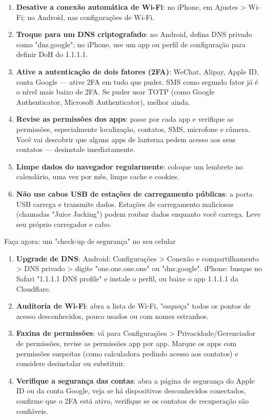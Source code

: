 \begin{enumerate}
  \item \textbf{Desative a conexão automática de Wi-Fi}: no iPhone, em Ajustes > Wi-Fi; no Android, nas configurações de Wi-Fi.
  \item \textbf{Troque para um DNS criptografado}: no Android, defina DNS privado como "dns.google"; no iPhone, use um app ou perfil de configuração para definir DoH do 1.1.1.1.
  \item \textbf{Ative a autenticação de dois fatores (2FA)}: WeChat, Alipay, Apple ID, conta Google — ative 2FA em tudo que puder. SMS como segundo fator já é o nível mais baixo de 2FA. Se puder usar TOTP (como Google Authenticator, Microsoft Authenticator), melhor ainda.
  \item \textbf{Revise as permissões dos apps}: passe por cada app e verifique as permissões, especialmente localização, contatos, SMS, microfone e câmera. Você vai descobrir que alguns apps de lanterna pedem acesso aos seus contatos — desinstale imediatamente.
  \item \textbf{Limpe dados do navegador regularmente}: coloque um lembrete no calendário, uma vez por mês, limpe cache e cookies.
  \item \textbf{Não use cabos USB de estações de carregamento públicas}: a porta USB carrega e transmite dados. Estações de carregamento maliciosas (chamadas "Juice Jacking") podem roubar dados enquanto você carrega. Leve seu próprio carregador e cabo.
\end{enumerate}

\begin{tcbpractice}{Faça agora: um "check-up de segurança" no seu celular}
\begin{enumerate}
  \item \textbf{Upgrade de DNS}: Android: Configurações > Conexão e compartilhamento > DNS privado > digite "one.one.one.one" ou "dns.google". iPhone: busque no Safari "1.1.1.1 DNS profile" e instale o perfil, ou baixe o app 1.1.1.1 da Cloudflare.
  \item \textbf{Auditoria de Wi-Fi}: abra a lista de Wi-Fi, "esqueça" todos os pontos de acesso desconhecidos, pouco usados ou com nomes estranhos.
  \item \textbf{Faxina de permissões}: vá para Configurações > Privacidade/Gerenciador de permissões, revise as permissões app por app. Marque os apps com permissões suspeitas (como calculadora pedindo acesso aos contatos) e considere desinstalar ou substituir.
  \item \textbf{Verifique a segurança das contas}: abra a página de segurança do Apple ID ou da conta Google, veja se há dispositivos desconhecidos conectados, confirme que o 2FA está ativo, verifique se os contatos de recuperação são confiáveis.
\end{enumerate}

\end{tcbpractice}
